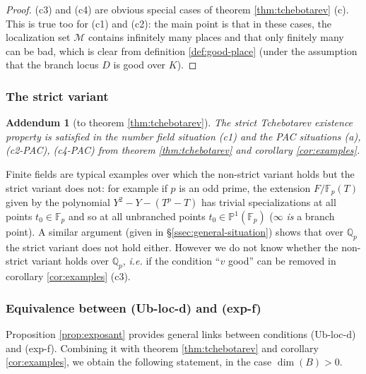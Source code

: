 \documentclass[12pt,english]{amsart}
\newtheorem{addenda}[theorem]{Addendum}
\newtheorem{twisting lemma}[theorem]{Twisting lemma}
\begin{document}
\begin{proof} (c3) and (c4) are  obvious special cases of theorem \ref{thm:tchebotarev} (c). This is true too for (c1) and (c2): the main point is that in these cases, the localization set ${\mathcal M}$ contains infinitely many places and that only finitely many can be bad, which is clear from definition \ref{def:good-place} (under the assumption that the branch locus $D$ is good over $K$).
\end{proof}

 \subsubsection{The strict variant} \label{ssec:strict-variant}
 
 \begin{addenda}[to theorem \ref{thm:tchebotarev}] \label{add:tchebotarev}
 The strict Tchebotarev existence pro\-per\-ty is satisfied in the number field situation {\rm (c1)} and the PAC si\-tua\-tions {\rm (a)}, {\rm (c2-PAC)}, {\rm (c4-PAC)} from theorem \ref{thm:tchebotarev} and corollary \ref{cor:examples}.
 \end{addenda}
 
 Finite fields are typical examples over which the non-strict variant holds but the strict variant does not: for example if $p$ is an odd prime, the extension $F/{\mathbb{F}}_p(T)$ given by the polynomial $Y^2-Y - (T^p-T)$ has trivial specializations at all points $t_0 \in {\mathbb{F}}_p$ and so at all unbranched points $t_0\in {\mathbb{P}}^1({\mathbb{F}}_p)$ ($\infty$ {\it is} a branch point). A similar argument (given in \S \ref{ssec:general-situation}) shows that over ${\mathbb{Q}}_p$ the strict variant does not hold either. However we do not know whether
the non-strict variant holds over ${\mathbb{Q}}_p$, {\it i.e.} if the condition ``$v$ good'' can be removed in corollary \ref{cor:examples} (c3).

\subsubsection{Equivalence between {\rm (Ub-loc-d)} and {\rm (exp-f)}}
Proposition \ref{prop:exposant} provides general links between conditions  {\rm (Ub-loc-d)} and {\rm (exp-f)}. Combining it with theorem \ref{thm:tchebotarev} and corollary \ref{cor:examples}, we obtain the following statement,  in the case $\dim(B)>0$. 
\end{document}
